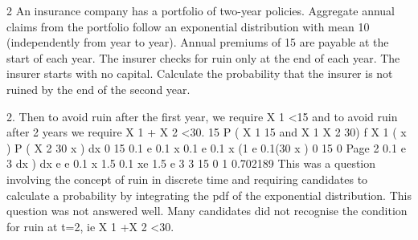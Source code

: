 \documentclass[a4paper,12pt]{article}
\begin{document}
2 An insurance company has a portfolio of two-year policies. Aggregate annual claims
from the portfolio follow an exponential distribution with mean 10 (independently
from year to year). Annual premiums of 15 are payable at the start of each year. The
insurer checks for ruin only at the end of each year. The insurer starts with no capital.
Calculate the probability that the insurer is not ruined by the end of the second year.

2. Then to avoid ruin after the first year, we require X 1 <15 and to avoid ruin after 2
years we require X 1 + X 2 <30.
15
P ( X 1 15 and X 1
X 2
30)
f X 1 ( x ) P ( X 2
30 x ) dx
0
15
0.1 e 0.1 x
0.1 e 0.1 x
(1 e
0.1(30 x )
0
15
0
Page 2
0.1 e 3 dx
) dx%
e
e
0.1 x
1.5
0.1 xe
1.5 e
3
3 15
0
1
0.702189
This was a question involving the concept of ruin in discrete time and requiring
candidates to calculate a probability by integrating the pdf of the exponential
distribution. This question was not answered well. Many candidates did not recognise
the condition for ruin at t=2, ie X 1 +X 2 <30.
\end{document}
